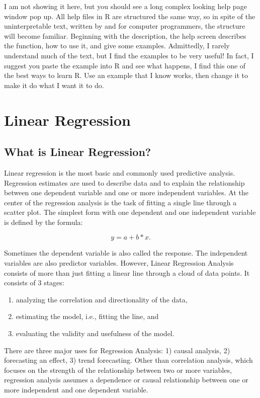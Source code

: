 \documentclass{article}\usepackage[]{graphicx}\usepackage[]{color}
\begin{document}
I am not showing it here, but you should see a long complex looking help page window pop up. All help files in R are structured the same way, so in spite of the uninterpretable text, written by and for computer programmers, the structure will become familiar. Beginning with the description, the help screen describes the function, how to use it, and give some examples. Admittedly, I rarely understand much of the text, but I find the examples to be very useful! In fact, I suggest you paste the example into R and see what happens, I find this one of the best ways to learn R. Use an example that I know works, then change it to make it do what I want it to do.

\section{Linear Regression}

\subsection{What is Linear Regression?}

Linear regression is the most basic and commonly used predictive analysis.  Regression estimates are used to describe data and to explain the relationship between one dependent variable and one or more independent variables.  At the center of the regression analysis is the task of fitting a single line through a scatter plot.  The simplest form with one dependent and one independent variable is defined by the formula:

\begin{equation}
y = a + b*x.
\end{equation}

Sometimes the dependent variable is also called the response.  The independent variables are also predictor variables.  However, Linear Regression Analysis consists of more than just fitting a linear line through a cloud of data points.  It consists of 3 stages:

\begin{enumerate}
  \item analyzing the correlation and directionality of the data, 
  \item estimating the model, i.e., fitting the line, and 
  \item evaluating the validity and usefulness of the model.
\end{enumerate}

There are three major uses for Regression Analysis: 1) causal analysis, 2) forecasting an effect, 3) trend forecasting.  Other than correlation analysis, which focuses on the strength of the relationship between two or more variables, regression analysis assumes a dependence or causal relationship between one or more independent and one dependent variable.
\end{document}
